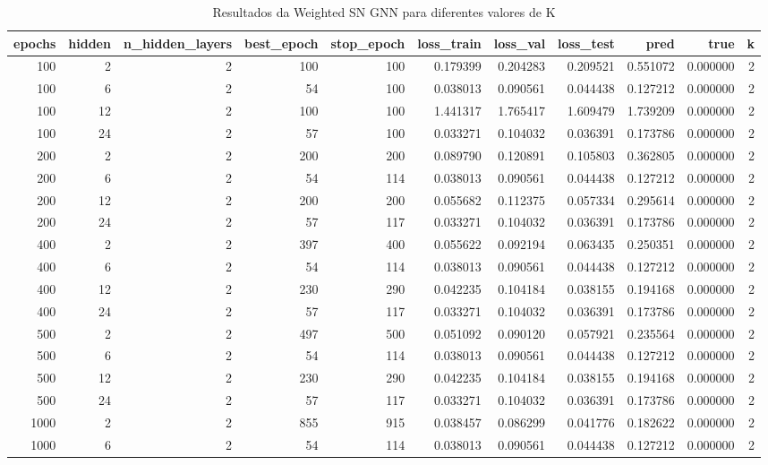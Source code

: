 \begin{table}
\caption{Resultados da Weighted SN GNN para diferentes valores de K}
\label{tab:weighted_gnn_results_all_k}
\begin{tabular}{rrrrrrrrrrr}
\toprule
epochs & hidden & n\_hidden\_layers & best\_epoch & stop\_epoch & loss\_train & loss\_val & loss\_test & pred & true & k \\
\midrule
100 & 2 & 2 & 100 & 100 & 0.179399 & 0.204283 & 0.209521 & 0.551072 & 0.000000 & 2 \\
100 & 6 & 2 & 54 & 100 & 0.038013 & 0.090561 & 0.044438 & 0.127212 & 0.000000 & 2 \\
100 & 12 & 2 & 100 & 100 & 1.441317 & 1.765417 & 1.609479 & 1.739209 & 0.000000 & 2 \\
100 & 24 & 2 & 57 & 100 & 0.033271 & 0.104032 & 0.036391 & 0.173786 & 0.000000 & 2 \\
200 & 2 & 2 & 200 & 200 & 0.089790 & 0.120891 & 0.105803 & 0.362805 & 0.000000 & 2 \\
200 & 6 & 2 & 54 & 114 & 0.038013 & 0.090561 & 0.044438 & 0.127212 & 0.000000 & 2 \\
200 & 12 & 2 & 200 & 200 & 0.055682 & 0.112375 & 0.057334 & 0.295614 & 0.000000 & 2 \\
200 & 24 & 2 & 57 & 117 & 0.033271 & 0.104032 & 0.036391 & 0.173786 & 0.000000 & 2 \\
400 & 2 & 2 & 397 & 400 & 0.055622 & 0.092194 & 0.063435 & 0.250351 & 0.000000 & 2 \\
400 & 6 & 2 & 54 & 114 & 0.038013 & 0.090561 & 0.044438 & 0.127212 & 0.000000 & 2 \\
400 & 12 & 2 & 230 & 290 & 0.042235 & 0.104184 & 0.038155 & 0.194168 & 0.000000 & 2 \\
400 & 24 & 2 & 57 & 117 & 0.033271 & 0.104032 & 0.036391 & 0.173786 & 0.000000 & 2 \\
500 & 2 & 2 & 497 & 500 & 0.051092 & 0.090120 & 0.057921 & 0.235564 & 0.000000 & 2 \\
500 & 6 & 2 & 54 & 114 & 0.038013 & 0.090561 & 0.044438 & 0.127212 & 0.000000 & 2 \\
500 & 12 & 2 & 230 & 290 & 0.042235 & 0.104184 & 0.038155 & 0.194168 & 0.000000 & 2 \\
500 & 24 & 2 & 57 & 117 & 0.033271 & 0.104032 & 0.036391 & 0.173786 & 0.000000 & 2 \\
1000 & 2 & 2 & 855 & 915 & 0.038457 & 0.086299 & 0.041776 & 0.182622 & 0.000000 & 2 \\
1000 & 6 & 2 & 54 & 114 & 0.038013 & 0.090561 & 0.044438 & 0.127212 & 0.000000 & 2 \\

\end{tabular}
\end{table}
